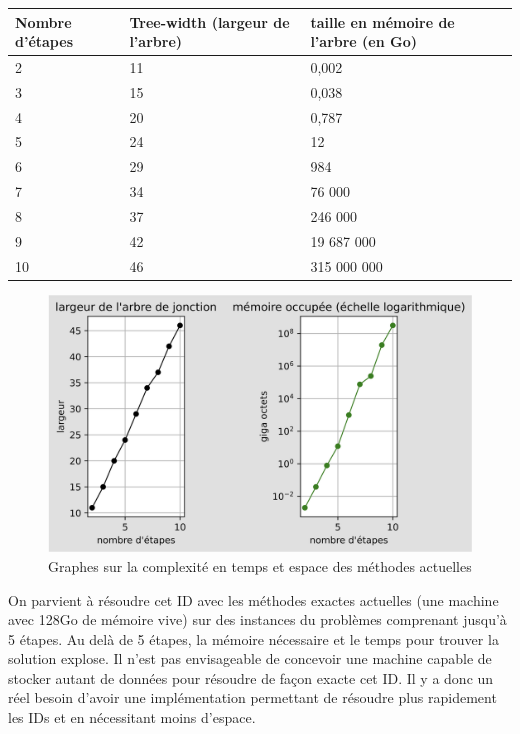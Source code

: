\documentclass[12pt]{article}
\begin{document}
\bigbreak
\begin{center}
   \begin{tabular}{|p{3cm} || p{3cm} | p{3cm} | }
    \hline
    Nombre d'étapes & Tree-width (largeur de l'arbre) & taille en mémoire de l'arbre (en Go) \\ 
    \hline
    2&11&0,002\\
    \hline
    3&15&0,038\\
    \hline
    4&20&0,787\\
    \hline
    5&24&12\\
    \hline
    6&29&984\\
    \hline
    7&34&76 000\\
    \hline
    8&37&246 000\\
    \hline
    9&42&19 687 000\\
    \hline
    10&46&315 000 000\\
    \hline
   \end{tabular}
\end{center}
 \begin{figure}[ht]
\centering
\includegraphics[scale=0.2]{docs/ressources_rapport/graphes.png}
\caption{Graphes sur la complexité en temps et espace des méthodes actuelles}
\end{figure}

On parvient à résoudre cet ID avec les méthodes exactes actuelles (une machine avec 128Go de mémoire vive) sur des instances du problèmes comprenant jusqu'à 5 étapes. Au delà de 5 étapes, la mémoire nécessaire et le temps pour trouver la solution explose. \bigbreak
Il n'est pas envisageable de concevoir une machine capable de stocker autant de données pour résoudre de façon exacte cet ID. Il y a donc un réel besoin d'avoir une implémentation permettant de résoudre plus rapidement les IDs et en nécessitant moins d'espace.
\bigbreak
\bigbreak
\pagebreak
\end{document}
